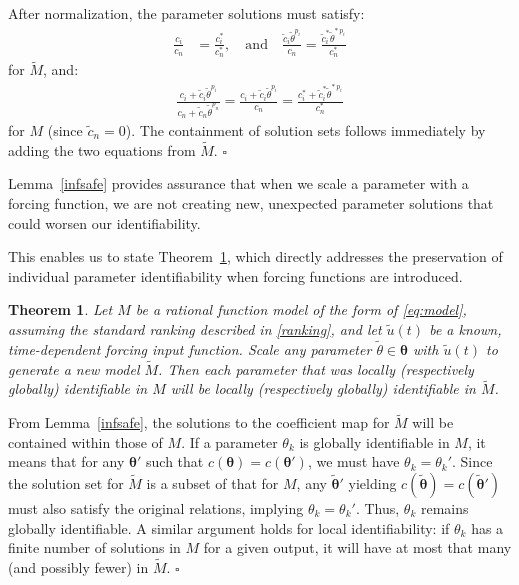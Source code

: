 \documentclass[a4paper,fleqn]{cas-dc}
\newtheorem{theorem}{Theorem}
\theoremstyle{definition}
\begin{document}
\begin{pf}
After normalization, the parameter solutions must satisfy:
\begin{align*}
\frac{c_i}{c_n} &= \frac{c^*_i}{c_n^*}, \quad \text{and} \quad \frac{\tilde{c}_i \tilde{\theta}^{p_i}}{c_n} = \frac{\tilde{c}_i^* \tilde{\theta}^{*~p_i}}{c_n^*}
\end{align*}
for $\tilde{M}$, and:
\begin{align*}
\frac{c_i + \tilde{c}_i \tilde{\theta}^{p_i}}{c_n + \tilde{c}_n \tilde{\theta}^{p_n}} = \frac{c_i + \tilde{c}_i \tilde{\theta}^{p_i}}{c_n} = \frac{c^*_i + \tilde{c}_i^* \tilde{\theta}^{*~p_i}}{c_n^*}
\end{align*}
for $M$ (since $\tilde{c}_n = 0$). The containment of solution sets follows immediately by adding the two equations from $\tilde{M}$. $\square$ 
\end{pf}

\noindent Lemma~\ref{infsafe} provides assurance that when we scale a parameter with a forcing function, we are not creating new, unexpected parameter solutions that could worsen our identifiability.  


This enables us to state Theorem~\ref{nothinglostthm}, which directly addresses the preservation of individual parameter identifiability when forcing functions are introduced.

\begin{theorem}\label{nothinglostthm}
   Let $M$ be a rational function model of the form of \cref{eq:model}, assuming the standard ranking described in \cref{ranking}, and let $\tilde{u}(t)$ be a known, time-dependent forcing input function. 
   Scale any parameter $\tilde{\theta} \in \pmb{\theta}$ with $\tilde{u}(t)$ to generate a new model $\tilde{M}$. 
   Then each parameter that was locally (respectively globally) identifiable in $M$ will be locally (respectively globally) identifiable in $\tilde{M}$.
\end{theorem}
\begin{pf}
    From Lemma~\ref{infsafe}, the solutions to the coefficient map for $\tilde{M}$ will be contained within those of $M$. 
    If a parameter $\theta_k$ is globally identifiable in $M$, it means that for any $\pmb{\theta}'$ such that $c(\pmb{\theta}) = c(\pmb{\theta}')$, we must have $\theta_k = \theta_k'$. Since the solution set for $\tilde{M}$ is a subset of that for $M$, any $\tilde{\pmb{\theta}}'$ yielding $c(\tilde{\pmb{\theta}}) = c(\tilde{\pmb{\theta}}')$ must also satisfy the original relations, implying $\theta_k = \theta_k'$. Thus, $\theta_k$ remains globally identifiable.
    A similar argument holds for local identifiability: if $\theta_k$ has a finite number of solutions in $M$ for a given output, it will have at most that many (and possibly fewer) in $\tilde{M}$.  $\square$
\end{pf}
\end{document}
